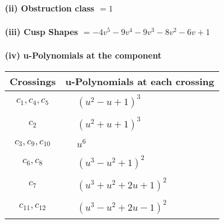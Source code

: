 \documentclass[1p]{elsarticle_modified}
\theoremstyle{definition}
\begin{document}
\flushleft \textbf{(ii) Obstruction class $= 1$}\\~\\
\flushleft \textbf{(iii) Cusp Shapes $= -4 v^5-9 v^4-9 v^3-8 v^2-6 v+1$}\\~\\
\newpage\renewcommand{\arraystretch}{1}
\flushleft \textbf{(iv) u-Polynomials at the component}\newline \\
\begin{tabular}{m{50pt}|m{274pt}}
Crossings & \hspace{64pt}u-Polynomials at each crossing \\
\hline $$\begin{aligned}c_{1},c_{4},c_{5}\end{aligned}$$&$\begin{aligned}
&(u^2- u+1)^3
\end{aligned}$\\
\hline $$\begin{aligned}c_{2}\end{aligned}$$&$\begin{aligned}
&(u^2+u+1)^3
\end{aligned}$\\
\hline $$\begin{aligned}c_{3},c_{9},c_{10}\end{aligned}$$&$\begin{aligned}
&u^6
\end{aligned}$\\
\hline $$\begin{aligned}c_{6},c_{8}\end{aligned}$$&$\begin{aligned}
&(u^3- u^2+1)^2
\end{aligned}$\\
\hline $$\begin{aligned}c_{7}\end{aligned}$$&$\begin{aligned}
&(u^3+u^2+2 u+1)^2
\end{aligned}$\\
\hline $$\begin{aligned}c_{11},c_{12}\end{aligned}$$&$\begin{aligned}
&(u^3- u^2+2 u-1)^2
\end{aligned}$\\
\hline
\end{tabular}\\~\\
\end{document}
